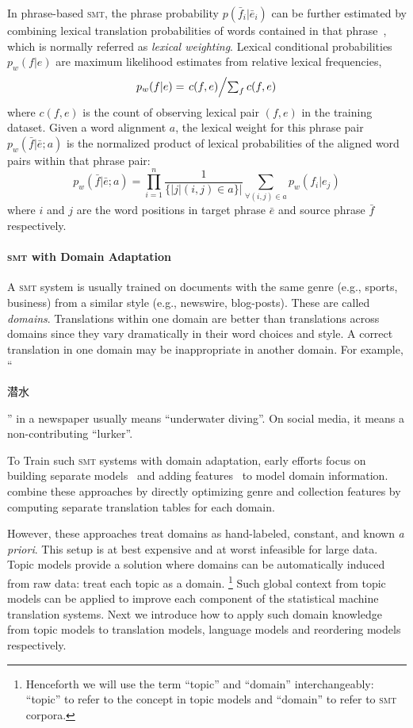 In phrase-based \textsc{smt}, the phrase probability $p(\bar{f}_i | \bar{e}_i)$ can be further estimated by combining lexical translation probabilities of words contained in that phrase~\citep{koehn-03}, which is normally referred as \textit{lexical weighting}. Lexical conditional probabilities $p_w(f|e)$ are maximum likelihood estimates from relative lexical frequencies,
\begin{equation}
\label{eq:lexical_prob}
p_w(f|e) = \textstyle \left.c(f, e)\middle/\sum_f{c(f, e)}\right.
\end{equation}
where $c(f, e)$ is the count of observing lexical pair $(f, e)$ in the training dataset. Given a word alignment $a$, the lexical weight for this phrase pair $p_w(\bar{f} | \bar{e}; a)$ is the normalized product of lexical probabilities of the aligned word pairs within that phrase pair:
\begin{equation}
\label{eq:phrase_prob}
p_w(\bar{f} | \bar{e}; a) = \prod^{n}_{i=1} \frac{1}{\{|j | (i, j) \in a\}|} \sum_{\forall (i,j) \in a} p_w(f_i | e_j)
\end{equation}
where $i$ and $j$ are the word positions in target phrase $\bar{e}$ and source phrase $\bar{f}$ respectively.

\paragraph{\textsc{smt} with Domain Adaptation}

A \textsc{smt} system is usually trained on documents with the same genre (e.g., sports, business) from a similar style (e.g., newswire, blog-posts).  These are called \emph{domains}.  Translations within one domain are better than translations across domains since they vary dramatically in their word choices and style.  A correct translation in one domain may be inappropriate in another domain.  For example, ``\begin{CJK*}{UTF8}{gbsn}潜水\end{CJK*}'' in a newspaper usually means ``underwater diving''.  On social media, it means a non-contributing ``lurker''.

To Train such \textsc{smt} systems with domain adaptation, early efforts focus on building separate models~\citep{foster-07} and adding features~\citep{matsoukas-09} to model domain information.  \citet{chiang-11} combine these approaches by directly optimizing genre and collection features by computing separate translation tables for each domain.

However, these approaches treat domains as hand-labeled, constant, and known \textit{a priori}.  This setup is at best expensive and at worst infeasible for large data.  Topic models provide a solution where domains can be automatically induced from raw data: treat each topic as a domain. \footnote{Henceforth we will use the term ``topic'' and ``domain'' interchangeably: ``topic'' to refer to the concept in topic models and ``domain'' to refer to \textsc{smt} corpora.}
Such global context from topic models can be applied to improve each component of the statistical machine translation systems. Next we introduce how to apply such domain knowledge from topic models to translation models, language models and reordering models respectively.

